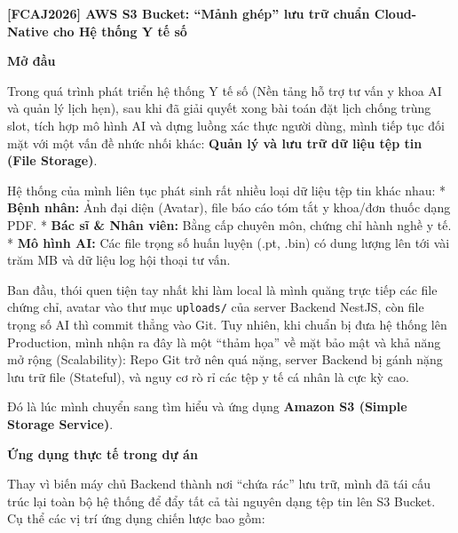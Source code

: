 \vspace{0.5em}\noindent\textbf{{[}FCAJ2026{]} AWS S3 Bucket: ``Mảnh ghép'' lưu trữ chuẩn
Cloud-Native cho Hệ thống Y tế số}

\vspace{0.5em}\noindent\textbf{Mở đầu}

Trong quá trình phát triển hệ thống Y tế số (Nền tảng hỗ trợ tư vấn y
khoa AI và quản lý lịch hẹn), sau khi đã giải quyết xong bài toán đặt
lịch chống trùng slot, tích hợp mô hình AI và dựng luồng xác thực người
dùng, mình tiếp tục đối mặt với một vấn đề nhức nhối khác: \textbf{Quản
lý và lưu trữ dữ liệu tệp tin (File Storage)}.

Hệ thống của mình liên tục phát sinh rất nhiều loại dữ liệu tệp tin khác
nhau: * \textbf{Bệnh nhân:} Ảnh đại diện (Avatar), file báo cáo tóm tắt
y khoa/đơn thuốc dạng PDF. * \textbf{Bác sĩ \& Nhân viên:} Bằng cấp
chuyên môn, chứng chỉ hành nghề y tế. * \textbf{Mô hình AI:} Các file
trọng số huấn luyện (.pt, .bin) có dung lượng lên tới vài trăm MB và dữ
liệu log hội thoại tư vấn.

Ban đầu, thói quen tiện tay nhất khi làm local là mình quăng trực tiếp
các file chứng chỉ, avatar vào thư mục \texttt{uploads/} của server
Backend NestJS, còn file trọng số AI thì commit thẳng vào Git. Tuy
nhiên, khi chuẩn bị đưa hệ thống lên Production, mình nhận ra đây là một
``thảm họa'' về mặt bảo mật và khả năng mở rộng (Scalability): Repo Git
trở nên quá nặng, server Backend bị gánh nặng lưu trữ file (Stateful),
và nguy cơ rò rỉ các tệp y tế cá nhân là cực kỳ cao.

Đó là lúc mình chuyển sang tìm hiểu và ứng dụng \textbf{Amazon S3
(Simple Storage Service)}.

\vspace{0.5em}\noindent\textbf{Ứng dụng thực tế trong dự án}

Thay vì biến máy chủ Backend thành nơi ``chứa rác'' lưu trữ, mình đã tái
cấu trúc lại toàn bộ hệ thống để đẩy tất cả tài nguyên dạng tệp tin lên
S3 Bucket. Cụ thể các vị trí ứng dụng chiến lược bao gồm:

